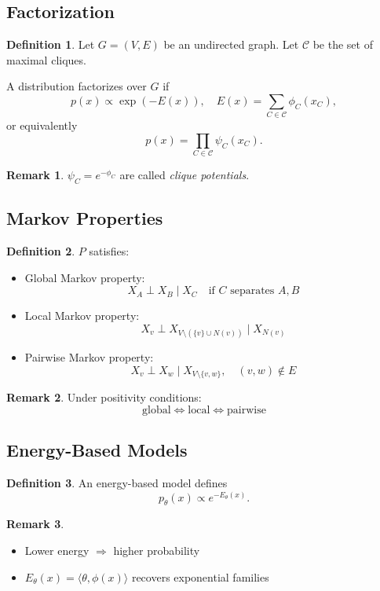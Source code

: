 \documentclass[12pt,oneside]{book}
\numberwithin{equation}{section}
\theoremstyle{definition}
\newtheorem{definition}{Definition}[section]
\newtheorem{remark}{Remark}[section]
\theoremstyle{plain}
\theoremstyle{remark}
\begin{document}
\subsection{Factorization}

\begin{definition}
Let $G=(V,E)$ be an undirected graph. Let $\mathcal{C}$ be the set of maximal cliques.

A distribution factorizes over $G$ if
\[
p(x) \propto \exp(-E(x)),
\quad
E(x) = \sum_{C \in \mathcal{C}} \phi_C(x_C),
\]
or equivalently
\[
p(x) = \prod_{C \in \mathcal{C}} \psi_C(x_C).
\]
\end{definition}

\begin{remark}
$\psi_C = e^{-\phi_C}$ are called \emph{clique potentials}.
\end{remark}


\subsection{Markov Properties}

\begin{definition}
$P$ satisfies:
\begin{itemize}
\item Global Markov property:
\[
X_A \perp X_B \mid X_C
\quad \text{if } C \text{ separates } A,B
\]
\item Local Markov property:
\[
X_v \perp X_{V \setminus (\{v\}\cup N(v))} \mid X_{N(v)}
\]
\item Pairwise Markov property:
\[
X_v \perp X_w \mid X_{V \setminus \{v,w\}}, \quad (v,w)\notin E
\]
\end{itemize}
\end{definition}

\begin{remark}
Under positivity conditions:
\[
\text{global} \iff \text{local} \iff \text{pairwise}
\]
\end{remark}


\subsection{Energy-Based Models}

\begin{definition}
An energy-based model defines
\[
p_\theta(x) \propto e^{-E_\theta(x)}.
\]
\end{definition}

\begin{remark}
\begin{itemize}
\item Lower energy $\Rightarrow$ higher probability
\item $E_\theta(x) = \langle \theta, \phi(x)\rangle$ recovers exponential families
\end{itemize}
\end{remark}
\end{document}
